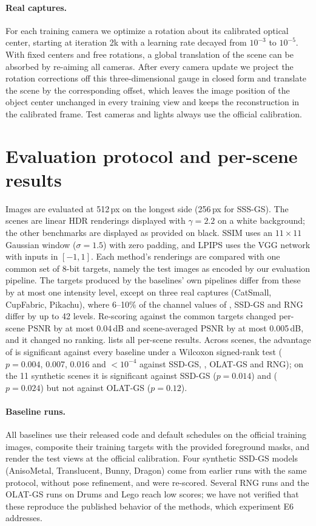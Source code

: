 \documentclass[10pt,twocolumn,letterpaper]{article}
\begin{document}
\paragraph{Real captures.}
For each training camera we optimize a rotation about its calibrated optical center, starting at iteration 2k with a learning rate decayed from $10^{-3}$ to $10^{-5}$.
With fixed centers and free rotations, a global translation of the scene can be absorbed by re-aiming all cameras.
After every camera update we project the rotation corrections off this three-dimensional gauge in closed form and translate the scene by the corresponding offset, which leaves the image position of the object center unchanged in every training view and keeps the reconstruction in the calibrated frame.
Test cameras and lights always use the official calibration.

\section{Evaluation protocol and per-scene results}
\label{sec:s_eval}
Images are evaluated at 512\,px on the longest side (256\,px for SSS-GS).
The \gsthree scenes are linear HDR renderings displayed with $\gamma=2.2$ on a white background; the other benchmarks are displayed as provided on black.
SSIM uses an $11\times11$ Gaussian window ($\sigma=1.5$) with zero padding, and LPIPS uses the VGG network with inputs in $[-1,1]$.
Each method's renderings are compared with one common set of 8-bit targets, namely the test images as encoded by our evaluation pipeline.
The targets produced by the baselines' own pipelines differ from these by at most one intensity level, except on three real captures (CatSmall, CupFabric, Pikachu), where 6--10\% of the channel values of \gsthree, SSD-GS and RNG differ by up to 42 levels.
Re-scoring against the common targets changed per-scene PSNR by at most 0.04\,dB and scene-averaged PSNR by at most 0.005\,dB, and it changed no ranking.
 lists all per-scene results.
Across scenes, the advantage of \ours is significant against every baseline under a Wilcoxon signed-rank test ($p=0.004$, 0.007, 0.016 and $<10^{-4}$ against SSD-GS, \gsthree, OLAT-GS and RNG); on the 11 synthetic scenes it is significant against SSD-GS ($p=0.014$) and \gsthree ($p=0.024$) but not against OLAT-GS ($p=0.12$).

\paragraph{Baseline runs.}
All baselines use their released code and default schedules on the official training images, composite their training targets with the provided foreground masks, and render the test views at the official calibration.
Four synthetic SSD-GS models (AnisoMetal, Translucent, Bunny, Dragon) come from earlier runs with the same protocol, without pose refinement, and were re-scored.
Several RNG runs and the OLAT-GS runs on Drums and Lego reach low scores; we have not verified that these reproduce the published behavior of the methods, which experiment E6 addresses.
\end{document}
